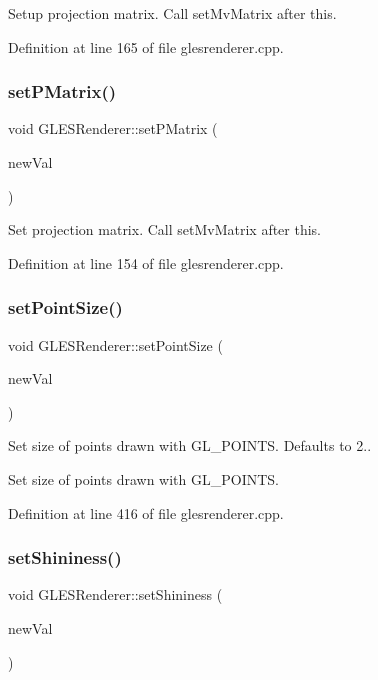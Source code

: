 Setup projection matrix. Call set\+Mv\+Matrix after this. 

Definition at line 165 of file glesrenderer.\+cpp.

\mbox{\label{class_g_l_e_s_renderer_ad439b83c368872dfd4439136d9af4d6d}} 
\subsubsection{\texorpdfstring{setPMatrix()}{setPMatrix()}}
{\footnotesize\ttfamily void G\+L\+E\+S\+Renderer\+::set\+P\+Matrix (\begin{DoxyParamCaption}\item[{const Q\+Matrix4x4}]{new\+Val }\end{DoxyParamCaption})}

Set projection matrix. Call set\+Mv\+Matrix after this. 

Definition at line 154 of file glesrenderer.\+cpp.

\mbox{\label{class_g_l_e_s_renderer_a2ea9d299d160c0757f75e883164f6e21}} 
\subsubsection{\texorpdfstring{setPointSize()}{setPointSize()}}
{\footnotesize\ttfamily void G\+L\+E\+S\+Renderer\+::set\+Point\+Size (\begin{DoxyParamCaption}\item[{float}]{new\+Val }\end{DoxyParamCaption})}

Set size of points drawn with G\+L\+\_\+\+P\+O\+I\+N\+TS. Defaults to 2..

Set size of points drawn with G\+L\+\_\+\+P\+O\+I\+N\+TS. 

Definition at line 416 of file glesrenderer.\+cpp.

\mbox{\label{class_g_l_e_s_renderer_a75fdf201c7a27ab2e053e2a5d37e4ac4}} 
\subsubsection{\texorpdfstring{setShininess()}{setShininess()}}
{\footnotesize\ttfamily void G\+L\+E\+S\+Renderer\+::set\+Shininess (\begin{DoxyParamCaption}\item[{float}]{new\+Val }\end{DoxyParamCaption})}

